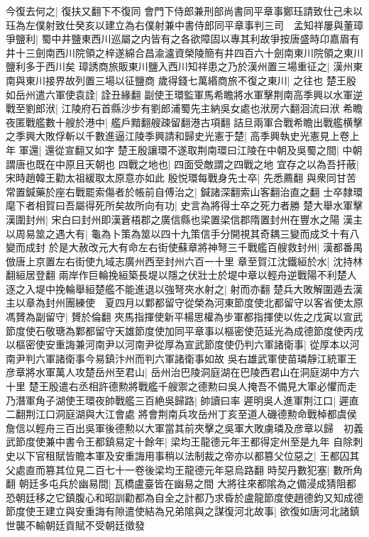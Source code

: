 今復去何之|{
	復扶又翻下不復同}
會門下侍郎兼刑部尚書同平章事鄭珏請致仕己未以珏為左僕射致仕癸亥以建立為右僕射兼中書侍郎同平章事判三司　孟知祥屢與董璋爭鹽利|{
	蜀中井鹽東西川巡屬之内皆有之各欲障固以專其利故爭按唐盛時卬嘉眉有井十三劍南西川院領之梓遂綿合昌渝瀘資榮陵簡有井四百六十劍南東川院領之東川鹽利多于西川矣}
璋誘商旅販東川鹽入西川知祥患之乃於漢州置三場重征之|{
	漢州東南與東川接界故列置三場以征鹽商}
歲得錢七萬緡商旅不復之東川|{
	之往也}
楚王殷如岳州遣六軍使袁詮|{
	詮丑緣翻}
副使王環監軍馬希瞻將水軍擊荆南高季興以水軍逆戰至劉郎洑|{
	江陵府石首縣沙步有劉郎浦蜀先主納吳女處也洑房六翻洄流曰洑}
希瞻夜匿戰艦數十艘於港中|{
	艦戶黯翻艘疎留翻港古項翻}
詰旦兩軍合戰希瞻出戰艦横擊之季興大敗俘斬以千數進逼江陵季興請和歸史光憲于楚|{
	高季興執史光憲見上卷上年}
軍還|{
	還從宣翻又如字}
楚王殷讓環不遂取荆南環曰江陵在中朝及吳蜀之間|{
	中朝謂唐也既在中原且天朝也}
四戰之地也|{
	四面受敵謂之四戰之地}
宜存之以為吾扞蔽|{
	宋時趙韓王勸太祖緩取太原意亦如此}
殷悦環每戰身先士卒|{
	先悉薦翻}
與衆同甘苦常置鍼藥於座右戰罷索傷者於帳前自傅治之|{
	鍼諸深翻索山客翻治直之翻}
士卒隸環麾下者相賀曰吾屬得死所矣故所向有功|{
	史言為將得士卒之死力者勝}
楚大舉水軍擊漢圍封州|{
	宋白曰封州即漢蒼梧郡之廣信縣也梁置梁信郡隋置封州在豐水之陽}
漢主以周易筮之遇大有|{
	龜為卜策為筮以四十九策信手分開視其奇耦三變而成爻十有八變而成封}
於是大赦改元大有命左右街使蘇章將神弩三千戰艦百艘救封州|{
	漢都番禺倣唐上京置左右街使九域志廣州西至封州六百一十里}
章至賀江沈鐵絙於水|{
	沈持林翻絙居登翻}
兩岸作巨輪挽絙築長堤以隱之伏壯士於堤中章以輕舟逆戰陽不利楚人逐之入堤中挽輪舉絙楚艦不能進退以強弩夾水射之|{
	射而亦翻}
楚兵大敗解圍遁去漢主以章為封州團練使　夏四月以鄴都留守從榮為河東節度使北都留守以客省使太原馮贇為副留守|{
	贇於倫翻}
夾馬指揮使新平楊思權為步軍都指揮使以佐之戊寅以宣武節度使石敬瑭為鄴都留守天雄節度使加同平章事以樞密使范延光為成德節度使丙戌以樞密使安重誨兼河南尹以河南尹從厚為宣武節度使仍判六軍諸衛事|{
	從厚本以河南尹判六軍諸衛事今易鎮汴州而判六軍諸衛事如故}
吳右雄武軍使苗璘靜江統軍王彦章將水軍萬人攻楚岳州至君山|{
	岳州治巴陵洞庭湖在巴陵西君山在洞庭湖中方六十里}
楚王殷遣右丞相許德勲將戰艦千艘禦之德勲曰吳人掩吾不備見大軍必懼而走乃潛軍角子湖使王環夜帥戰艦三百絶吳歸路|{
	帥讀曰率}
遲明吳人進軍荆江口|{
	遲直二翻荆江口洞庭湖與大江會處}
將會荆南兵攻岳州丁亥至道人磯德勲命戰棹都虞侯詹信以輕舟三百出吳軍後德勲以大軍當其前夾擊之吳軍大敗虜璘及彦章以歸　初義武節度使兼中書令王都鎮易定十餘年|{
	梁均王龍德元年王都得定州至是九年}
自除刺史以下官租賦皆贍本軍及安重誨用事稍以法制裁之帝亦以都篡父位惡之|{
	王都囚其父處直而篡其位見二百七十一卷後梁均王龍德元年惡烏路翻}
時契丹數犯塞|{
	數所角翻}
朝廷多屯兵於幽易間|{
	瓦橋盧臺皆在幽易之間}
大將往來都隂為之備浸成猜阻都恐朝廷移之它鎮腹心和昭訓勸都為自全之計都乃求昏於盧龍節度使趙德鈞又知成德節度使王建立與安重誨有隙遣使結為兄弟隂與之謀復河北故事|{
	欲復如唐河北諸鎮世襲不輸朝廷貢賦不受朝廷徵發}
